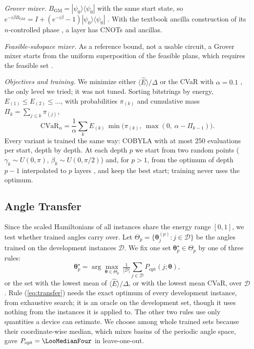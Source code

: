 \documentclass[conference]{IEEEtran}
\begin{document}
\textit{Grover mixer.} $B_{\mathrm{GM}}=|\psi_0\rangle\langle\psi_0|$ with the same start state, so $e^{-i\beta B_{\mathrm{GM}}}=I+(e^{-i\beta}-1)|\psi_0\rangle\langle\psi_0|$ \cite{Bartschi2020}. With the textbook ancilla construction of its $n$-controlled phase \cite{Nielsen2010}, a layer has \CnotGM{} CNOTs and \NAnc{} ancillas.

\textit{Feasible-subspace mixer.} As a reference bound, not a usable circuit, a Grover mixer starts from the uniform superposition of the feasible plans, which requires the feasible set \cite{Bartschi2020,Fuchs2024}.

\textit{Objectives and training.} We minimize either $\langle\hat E\rangle/\Delta$ or the CVaR with $\alpha=0.1$ \cite{Barkoutsos2020}, the only level we tried; it was not tuned. Sorting bitstrings by energy, $E_{(1)}\le E_{(2)}\le\dots$, with probabilities $\pi_{(k)}$ and cumulative mass $\Pi_k=\sum_{j\le k}\pi_{(j)}$,
\begin{equation}
\mathrm{CVaR}_\alpha=\frac1\alpha\sum_k E_{(k)}\,\min\!\big(\pi_{(k)},\ \max(0,\ \alpha-\Pi_{k-1})\big).
\label{eq:cvar}
\end{equation}
Every variant is trained the same way: COBYLA \cite{Powell1994} with at most 250 evaluations per start, depth by depth. At each depth $p$ we start from two random points ($\gamma_k\sim U(0,\pi)$, $\beta_k\sim U(0,\pi/2)$) and, for $p>1$, from the optimum of depth $p-1$ interpolated to $p$ layers \cite{Zhou2020}, and keep the best start; training never uses the optimum.

\subsection{Angle Transfer}\label{sec:transfer}
Since the scaled Hamiltonians of all instances share the energy range $[0,1]$, we test whether trained angles carry over. Let $\Theta_p=\{\boldsymbol\theta_j^{(p)}:j\in\mathcal{D}\}$ be the angles trained on the development instances $\mathcal{D}$. We fix one set $\boldsymbol\theta^{\star}_p\in\Theta_p$ by one of three rules:
\begin{equation}
\boldsymbol\theta^{\star}_p=\arg\max_{\boldsymbol\theta\in\Theta_p}\ \tfrac{1}{|\mathcal{D}|}\textstyle\sum_{j\in\mathcal{D}}P_{\mathrm{opt}}(j;\boldsymbol\theta),
\label{eq:transfer}
\end{equation}
or the set with the lowest mean of $\langle\hat E\rangle/\Delta$, or with the lowest mean CVaR, over $\mathcal{D}$. Rule (\ref{eq:transfer}) needs the exact optimum of every development instance, from exhaustive search; it is an oracle on the development set, though it uses nothing from the instances it is applied to. The other two rules use only quantities a device can estimate. We choose among whole trained sets because their coordinate-wise median, which mixes basins of the periodic angle space, gave $P_{\mathrm{opt}}=\LooMedianFour$ in leave-one-out.
\end{document}

